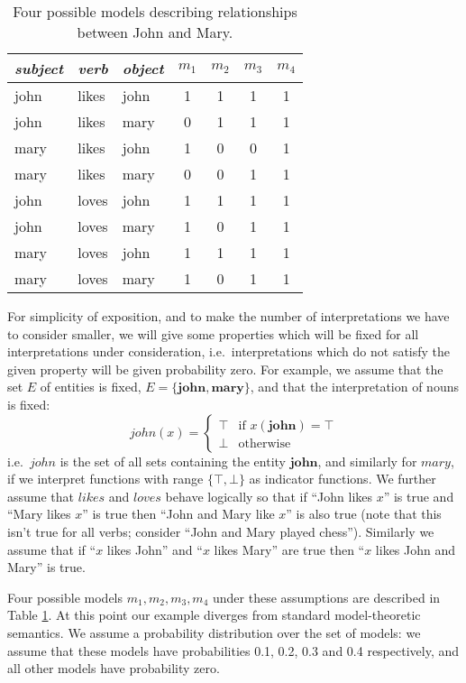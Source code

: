 \documentclass{svmult}
\begin{document}
\begin{table}
\begin{center}
\begin{tabular}{|l|l|l||c|c|c|c|}
\hline
\emph{subject} & \emph{verb} & \emph{object} & $m_1$ & $m_2$ & $m_3$ & $m_4$\\
\hline
john & likes & john & 1 & 1 & 1 & 1\\
john & likes & mary & 0 & 1 & 1 & 1\\
mary & likes & john & 1 & 0 & 0 & 1\\
mary & likes & mary & 0 & 0 & 1 & 1\\
john & loves & john & 1 & 1 & 1 & 1\\
john & loves & mary & 1 & 0 & 1 & 1\\
mary & loves & john & 1 & 1 & 1 & 1\\
mary & loves & mary & 1 & 0 & 1 & 1\\
\hline
\end{tabular}
\caption{Four possible models describing relationships between John
  and Mary.}
\end{center}
\label{table:models}
\end{table}

For simplicity of exposition, and to make the number of
interpretations we have to consider smaller, we will give some
properties which will be fixed for all interpretations under
consideration, i.e.~interpretations which do not satisfy the given
property will be given probability zero. For example, we assume that
the set $E$ of entities is fixed, $E = \{\mathbf{john},
\mathbf{mary}\}$, and that the interpretation of nouns is fixed:
$$\mathit{john}(x) = \begin{cases}
\top & \text{if } x(\mathbf{john}) = \top\\
\bot & \text{otherwise}
\end{cases}$$ i.e.~$\mathit{john}$ is the set of all sets containing
the entity $\mathbf{john}$, and similarly for $\mathit{mary}$, if we
interpret functions with range $\{\top,\bot\}$ as indicator
functions. We further assume that $\mathit{likes}$ and
$\mathit{loves}$ behave logically so that if ``John likes $x$'' is
true and ``Mary likes $x$'' is true then ``John and Mary like $x$'' is
also true (note that this isn't true for all verbs; consider ``John
and Mary played chess''). Similarly we assume that if ``$x$ likes
John'' and ``$x$ likes Mary'' are true then ``$x$ likes John and
Mary'' is true.

Four possible models $m_1, m_2, m_3, m_4$ under these assumptions are
described in Table \ref{table:models}. At this point our example
diverges from standard model-theoretic semantics. We assume a
probability distribution over the set of models: we assume that these
models have probabilities 0.1, 0.2, 0.3 and 0.4 respectively, and all
other models have probability zero.
\end{document}
